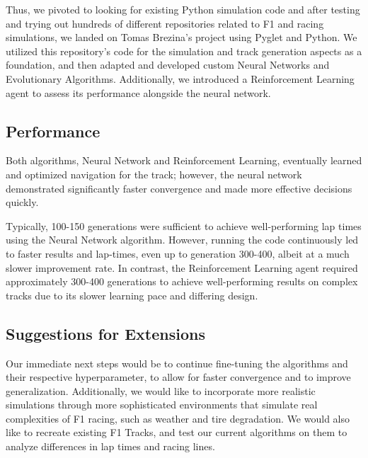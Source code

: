\documentclass[12pt]{article}
\begin{document}
Thus, we pivoted to looking for existing Python simulation code and after 
testing and trying out hundreds of different repositories related to F1 and 
racing simulations, we landed on Tomas Brezina's project using Pyglet and 
Python. We utilized this repository's code for the simulation and track
generation aspects as a foundation, and then adapted and developed custom 
Neural Networks and Evolutionary Algorithms. Additionally, we introduced a 
Reinforcement Learning agent to assess its performance alongside the neural 
network.

\subsection{Performance}

Both algorithms, Neural Network and Reinforcement Learning, eventually learned 
and optimized navigation for the track; however, the neural network demonstrated 
significantly faster convergence and made more effective decisions quickly. 

Typically, 100-150 generations were sufficient to achieve well-performing 
lap times using the Neural Network algorithm. However, running the code 
continuously led to faster results and lap-times, even up to generation 
300-400, albeit at a much slower improvement rate. In contrast, the 
Reinforcement Learning agent required approximately 300-400 generations to 
achieve well-performing results on complex tracks due to its slower learning 
pace and differing design.

\subsection{Suggestions for Extensions}

Our immediate next steps would be to continue fine-tuning the algorithms and 
their respective hyperparameter, to allow for faster convergence and to improve 
generalization. Additionally, we would like to incorporate more realistic 
simulations through more sophisticated environments that simulate real 
complexities of F1 racing, such as weather and tire degradation. We would also 
like to recreate existing F1 Tracks, and test our current algorithms on them 
to analyze differences in lap times and racing lines. 
\end{document}
